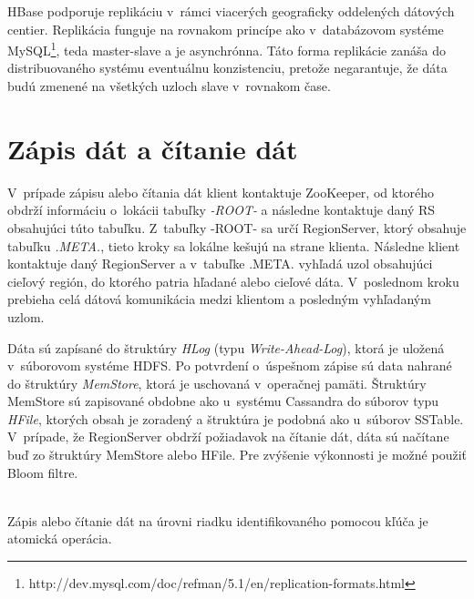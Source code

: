 \documentclass[11pt,twoside,a4paper]{book}
\begin{document}
HBase podporuje replikáciu v~rámci viacerých geograficky oddelených dátových centier. Replikácia funguje na rovnakom princípe ako v~databázovom systéme MySQL\footnote{http://dev.mysql.com/doc/refman/5.1/en/replication-formats.html}, teda master-slave a je asynchrónna. Táto forma replikácie zanáša do distribuovaného systému eventuálnu konzistenciu, pretože negarantuje, že dáta budú zmenené na všetkých uzloch slave v~rovnakom čase.




\section{Zápis dát a čítanie dát}


V~prípade zápisu alebo čítania dát klient kontaktuje ZooKeeper, od ktorého obdrží informáciu o~lokácii tabuľky \emph{-ROOT-} a následne kontaktuje daný RS obsahujúci túto tabuľku. Z~tabuľky -ROOT- sa určí RegionServer, ktorý obsahuje tabuľku \emph{.META.}, tieto kroky sa lokálne kešujú na strane klienta. Následne klient kontaktuje daný RegionServer a v~tabuľke .META. vyhľadá uzol obsahujúci cieľový región, do ktorého patria hľadané alebo cieľové dáta. V~poslednom kroku prebieha celá dátová komunikácia medzi klientom a posledným vyhľadaným uzlom.

Dáta sú zapísané do štruktúry \emph{HLog} (typu \emph{Write-Ahead-Log}), ktorá je uložená v~súborovom systéme HDFS. Po potvrdení o~úspešnom zápise sú data nahrané do štruktúry \emph{MemStore}, ktorá je uschovaná v~operačnej pamäti. Štruktúry MemStore sú zapisované obdobne ako u~systému Cassandra do  súborov typu \emph{HFile}, ktorých obsah je zoradený a štruktúra je podobná ako u~súborov SSTable.
\noindent
V~prípade, že RegionServer obdrží požiadavok na čítanie dát, dáta sú načítane buď zo štruktúry MemStore alebo HFile. Pre zvýšenie výkonnosti je možné použiť Bloom filtre.

% 
% 
\noindent
\\
Zápis alebo čítanie dát na úrovni riadku identifikovaného pomocou kľúča je atomická operácia. 
\end{document}
